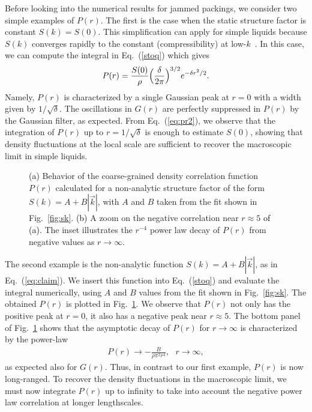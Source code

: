 \documentclass[aps,pre,twocolumn,superscriptaddress]{revtex4-1}
\newcommand{\red}[1]{\textcolor{black}{#1}}
\begin{document}
Before looking into the numerical results for jammed packings, 
we consider two simple examples of $P(r)$. 
The first is the case when the static structure factor is 
constant $S(k) = S(0)$. 
This simplification can apply for simple liquids 
because $S(k)$ converges rapidly to the constant (compressibility) 
at low-$k$~\cite{hansen}.  
In this case, we can compute the integral in Eq.~(\ref{stoq}) which gives
\begin{eqnarray}
P(r) = \frac{S(0)}{\rho} \Bigl( \frac{\delta}{2\pi} \Bigr)^{3/2} 
e^{- \delta r^2/2}.
\label{eq:pr2} 
\end{eqnarray}
Namely, $P(r)$ is characterized by a single Gaussian 
peak at $r=0$ with a width given by $1/\sqrt{\delta}$. 
The oscillations in $G(r)$ are perfectly suppressed in $P(r)$
by the Gaussian filter, as expected. 
From Eq.~(\ref{eq:pr2}), we observe that the 
integration of $P(r)$ up to $r=1/\sqrt{\delta}$ 
is enough to estimate $S(0)$, showing that  
density fluctuations at the local scale are sufficient to 
recover the macroscopic limit in simple liquids.

\begin{figure}
\begin{center}
\caption{\red{(a)} Behavior of the coarse-grained density 
correlation function $P(r)$ calculated for a 
non-analytic structure factor of the form 
$S(k) = A + B|\vec{k}|$, with $A$ and $B$ taken from the fit
shown in Fig.~\ref{fig:sk}.
\red{(b)} A zoom on the negative correlation near $r \approx 5$ \red{of (a)}. 
The inset illustrates the $r^{-4}$ power law decay of $P(r)$ 
from negative values as $r \to \infty$.}
\label{fig:pr}
\end{center}
\end{figure}
 
The second example is the non-analytic function $S(k) = A + B|\vec{k}|$,
as in Eq.~(\ref{eq:claim}). 
We insert this function into Eq.~(\ref{stoq}) and evaluate 
the integral numerically, using $A$ and $B$ values 
from the fit shown in Fig.~\ref{fig:sk}.
The obtained $P(r)$ is plotted in Fig.~\ref{fig:pr}. We observe that 
$P(r)$ not only has the positive peak at $r=0$, it also has  
a negative peak near $r \approx 5$. 
The bottom panel of Fig.~\ref{fig:pr} shows that 
the asymptotic decay of $P(r)$ for $r \to \infty$ 
is characterized by the power-law 
\begin{eqnarray}
P(r) \to - \frac{B}{\rho \pi^2 r^4}, \ \ \  r \to \infty,  
\label{eq:asymptotic}
\end{eqnarray}
as expected also for $G(r)$. Thus, in contrast to our 
first example, $P(r)$ is now long-ranged. 
To recover the density fluctuations in the macroscopic limit, 
we must now integrate $P(r)$ up to infinity 
to take into account the negative power law correlation at 
longer lengthscales.  
\end{document}
